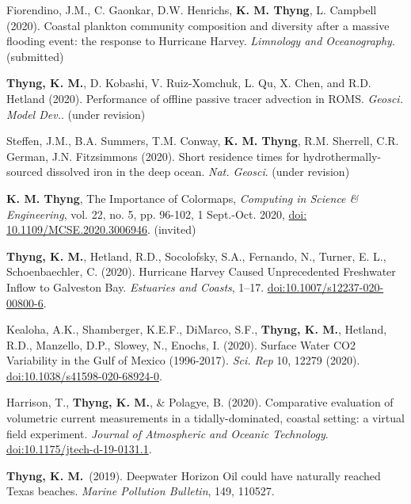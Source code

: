 \documentclass[10pt,letterpaper]{article}
\newcommand{\kmt}{\textbf{K. M. Thyng}}
\newcommand{\tkm}{\textbf{Thyng, K. M.}}
\renewenvironment{itemize}{
  \begin{list}{}{
    \setlength{\leftmargin}{1.5em}
    \setlength{\itemsep}{0.25em}
    \setlength{\parskip}{0pt}
    \setlength{\parsep}{0.25em}
  }
}{
  \end{list}
}
\begin{document}
\begin{itemize}

\item Fiorendino, J.M., C. Gaonkar, D.W. Henrichs, \kmt, L. Campbell (2020). Coastal plankton community composition and diversity after a massive flooding event: the response to Hurricane Harvey. \textit{Limnology and Oceanography}. (submitted)

\item \tkm, D. Kobashi, V. Ruiz-Xomchuk, L. Qu, X. Chen, and R.D. Hetland (2020). Performance of offline passive tracer advection in ROMS. \textit{Geosci. Model Dev.}. (under revision)

\item Steffen, J.M., B.A. Summers, T.M. Conway, \kmt, R.M. Sherrell, C.R. German, J.N. Fitzsimmons (2020). Short residence times for hydrothermally-sourced dissolved iron in the deep ocean. \textit{Nat. Geosci}. (under revision)

\item \kmt, The Importance of Colormaps, \textit{Computing in Science & Engineering}, vol. 22, no. 5, pp. 96-102, 1 Sept.-Oct. 2020, \href{https://doi.org/10.1109/MCSE.2020.3006946}{doi: 10.1109/MCSE.2020.3006946}. (invited)

\item \tkm, Hetland, R.D., Socolofsky, S.A., Fernando, N., Turner, E. L., Schoenbaechler, C. (2020). Hurricane Harvey Caused Unprecedented Freshwater Inflow to Galveston Bay. \textit{Estuaries and Coasts}, 1--17. \href{https://doi.org/10.1007/s12237-020-00800-6}{doi:10.1007/s12237-020-00800-6}.

\item Kealoha, A.K., Shamberger, K.E.F., DiMarco, S.F., \tkm, Hetland, R.D., Manzello, D.P., Slowey, N., Enochs, I. (2020). Surface Water CO2 Variability in the Gulf of Mexico (1996-2017). \textit{Sci. Rep} 10, 12279 (2020). \href{https://doi.org/10.1038/s41598-020-68924-0}{doi:10.1038/s41598-020-68924-0}.

\item Harrison, T., \tkm, & Polagye, B. (2020). Comparative evaluation of volumetric current measurements in a tidally-dominated, coastal setting: a virtual field experiment. \textit{Journal of Atmospheric and Oceanic Technology}.  \href{http://doi.org/10.1175/jtech-d-19-0131.1}{doi:10.1175/jtech-d-19-0131.1}.

\item \tkm~(2019). Deepwater Horizon Oil could have naturally reached Texas beaches. \textit{Marine Pollution Bulletin}, 149, 110527.


\end{itemize}
\end{document}
